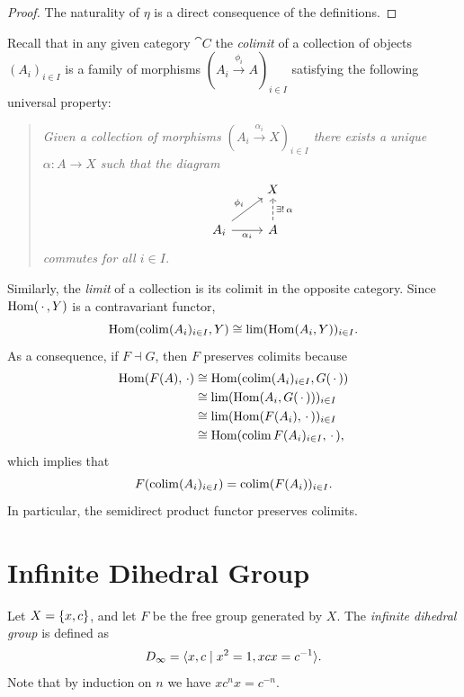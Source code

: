 \begin{proof}
    The naturality of $\eta$ is a direct consequence of the definitions.
\end{proof}

\begin{rem}
    Recall that in any given category $\cat C$ the \textsl{colimit} of a collection of objects $(A_i)_{i\in I}$ is a family of morphisms $(A_i\stackrel{\phi_i}\to A)_{i\in I}$ satisfying the following universal property: 
    \begin{quote}\it
        Given a collection of morphisms\/ $(A_i\stackrel{\alpha_i}\to X)_{i\in I}$ there exists a unique\/ $\alpha\colon A\to X$ such that the diagram
        $$
            \begin{tikzcd}
                    &X\\
                A_i
                        \arrow[ru,"\phi_i"]
                        \arrow[r,"\alpha_i"']
                    &A
                        \arrow[u,"{\exists!\,\alpha}"',dashed]
            \end{tikzcd}
        $$
        commutes for all\/ $i\in I$.
    \end{quote}
    Similarly, the \textsl{limit} of a collection is its colimit in the opposite category. Since ${\rm Hom}(\,\cdot\,,Y)$ is a contravariant functor,
    $$
        {\rm Hom}(\operatorname{colim}(A_i)_{i\in I},Y)\cong\lim({\rm Hom}(A_i,Y))_{i\in I}.
    $$
    As a consequence, if $F\dashv G$, then $F$ preserves colimits because
    \begin{align*}
        {\rm Hom}(F(A), \,\cdot) &\cong {\rm Hom}(\operatorname{colim}(A_i)_{i\in I}, G(\,\cdot\,))\\
            &\cong\lim({\rm Hom}(A_i, G(\,\cdot\,)))_{i\in I}\\
            &\cong\lim({\rm Hom}(F(A_i), \,\cdot\,))_{i\in I}\\
            &\cong{\rm Hom}(\operatorname{colim}F(A_i)_{i\in I},\,\cdot\,),
    \end{align*}
    which implies that
    $$
        F(\operatorname{colim}(A_i)_{i\in I})=\operatorname{colim}(F(A_i))_{i\in I}.
    $$
    In particular, the semidirect product functor preserves colimits.
\end{rem}

\section{Infinite Dihedral Group}

\begin{defn}
    Let\/ $X=\{x,c\}$, and let\/ $F$ be the free group generated by\/ $X$. The \textsl{infinite dihedral group} is defined as
    $$
        D_\infty=\langle x,c\mid x^2=1, xcx=c^{-1}\rangle.
    $$
    Note that by induction on $n$ we have $xc^nx=c^{-n}$.
\end{defn}


